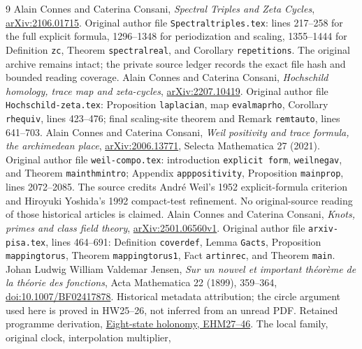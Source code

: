 \documentclass[11pt,a4paper]{article}
\theoremstyle{definition}\newtheorem{definition}[theorem]{Definition}
\begin{document}
\begin{thebibliography}{9}
Alain Connes and Caterina Consani,
\emph{Spectral Triples and Zeta Cycles},
\href{https://arxiv.org/abs/2106.01715}{arXiv:2106.01715}.
Original author file \texttt{Spectraltriples.tex}:
lines 217--258 for the full explicit formula,
1296--1348 for periodization and scaling,
1355--1444 for Definition \texttt{zc}, Theorem
\texttt{spectralreal}, and Corollary \texttt{repetitions}.
The original archive remains intact; the private source ledger
records the exact file hash and bounded reading coverage.
Alain Connes and Caterina Consani,
\emph{Hochschild homology, trace map and zeta-cycles},
\href{https://arxiv.org/abs/2207.10419}{arXiv:2207.10419}.
Original author file \texttt{Hochschild-zeta.tex}:
Proposition \texttt{laplacian}, map \texttt{evalmaprho},
Corollary \texttt{rhequiv}, lines 423--476;
final scaling-site theorem and Remark \texttt{remtauto},
lines 641--703.
Alain Connes and Caterina Consani,
\emph{Weil positivity and trace formula, the archimedean place},
\href{https://arxiv.org/abs/2006.13771}{arXiv:2006.13771},
Selecta Mathematica 27 (2021).
Original author file \texttt{weil-compo.tex}:
introduction \texttt{explicit form}, \texttt{weilnegav},
and Theorem \texttt{mainthmintro};
Appendix \texttt{apppositivity}, Proposition
\texttt{mainprop}, lines 2072--2085.
The source credits Andr\'e Weil's 1952 explicit-formula
criterion and Hiroyuki Yoshida's 1992 compact-test refinement.
No original-source reading of those historical articles is claimed.
Alain Connes and Caterina Consani,
\emph{Knots, primes and class field theory},
\href{https://arxiv.org/abs/2501.06560v1}{arXiv:2501.06560v1}.
Original author file \texttt{arxiv-pisa.tex}, lines 464--691:
Definition \texttt{coverdef}, Lemma \texttt{Gacts},
Proposition \texttt{mappingtorus}, Theorem
\texttt{mappingtorus1}, Fact \texttt{artinrec}, and
Theorem \texttt{main}.
Johan Ludwig William Valdemar Jensen,
\emph{Sur un nouvel et important th\'eor\`eme de la th\'eorie
des fonctions}, Acta Mathematica 22 (1899), 359--364,
\href{https://doi.org/10.1007/BF02417878}
{doi:10.1007/BF02417878}.
Historical metadata attribution; the circle argument used
here is proved in HW25--26, not inferred from an unread PDF.
Retained programme derivation,
\href{https://github.com/KokunoYumeto/zeta-function-research-reader/blob/adfbfe74fa49e31cb7aa068cf755fb083be37c32/workbenches/splitzero-tandem/branches/tau-zero-prime-positivity/EIGHT_STATE_HOLONOMY_DERIVATION.md}
{Eight-state holonomy, EHM27--46}.
The local family, original clock, interpolation multiplier,

\end{thebibliography}
\end{document}
